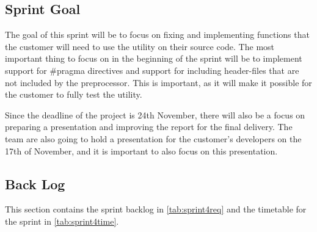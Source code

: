 \subsection{Sprint Goal}
The goal of this sprint will be to focus on fixing and implementing functions that the customer will need to use the \gls{utility} on their source code. The most important thing to focus on in the beginning of the sprint will be to implement support for \#pragma directives and support for including \gls{header}-files that are not included by the \gls{preprocessor}. This is important, as it will make it possible for the customer to fully test the \gls{utility}.

Since the deadline of the project is 24th November, there will also be a focus on preparing a presentation and improving the report for the final delivery. The team are also going to hold a presentation for the customer's developers on the 17th of November, and it is important to also focus on this presentation.

\subsection{Back Log}
This section contains the sprint backlog in \autoref{tab:sprint4req} and the timetable for the sprint in \autoref{tab:sprint4time}.  

